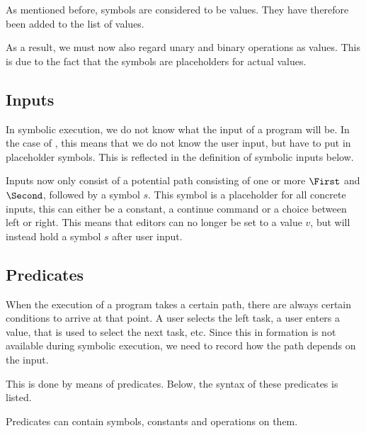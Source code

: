 As mentioned before, symbols are considered to be values.
They have therefore been added to the list of values.


As a result, we must now also regard unary and binary operations as values.
This is due to the fact that the symbols are placeholders for actual values.



\subsection{Inputs}

In symbolic execution, we do not know what the input of a program will be.
In the case of \TOPHAT, this means that we do not know the user input, but have to put in placeholder symbols.
This is reflected in the definition of symbolic inputs below.


Inputs now only consist of a potential path consisting of one or more $\First$ and $\Second$,
followed by a symbol $s$.
This symbol is a placeholder for all concrete inputs, this can either be a constant, a continue command or a choice between left or right.
This means that editors can no longer be set to a value $v$, but will instead hold a symbol $s$ after user input.


\subsection{Predicates}

When the execution of a \TOPHAT program takes a certain path, there are always certain conditions to arrive at that point.
A user selects the left task, a user enters a value, that is used to select the next task, etc.
Since this in formation is not available during symbolic execution, we need to record how the path depends on the input.

This is done by means of predicates.
Below, the syntax of these predicates is listed.


Predicates can contain symbols, constants and operations on them.

